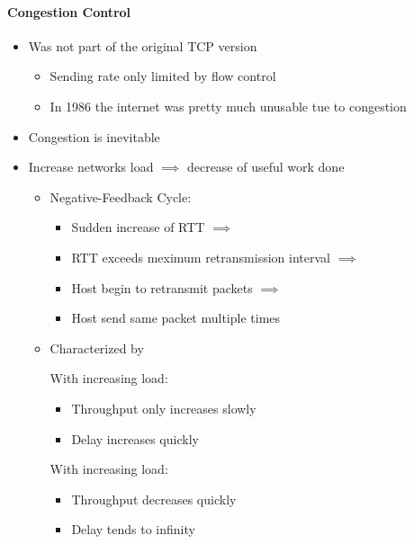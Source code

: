 \paragraph{Congestion Control}
\begin{itemize}
    \item Was not part of the original TCP version
        \begin{itemize}
            \item Sending rate only limited by flow control
            \item In 1986 the internet was pretty much unusable tue to congestion
        \end{itemize}
    \item Congestion is inevitable
    \item Increase networks load $\implies$ decrease of useful work done
        \begin{itemize}
            \item Negative-Feedback Cycle:
                \begin{itemize}
                    \item Sudden increase of RTT $\implies$
                    \item RTT exceeds meximum retransmission interval $\implies$
                    \item Host begin to retransmit packets $\implies$
                    \item Host send same packet multiple times
                \end{itemize}
            \item Characterized by
                \begin{itemize}
                     With increasing load:
                        \begin{itemize}
                            \item Throughput only increases slowly
                            \item Delay increases quickly
                        \end{itemize}
                     With increasing load:
                        \begin{itemize}
                            \item Throughput decreases quickly
                            \item Delay tends to infinity
                        \end{itemize}

\end{itemize}
\end{itemize}
\end{itemize}
